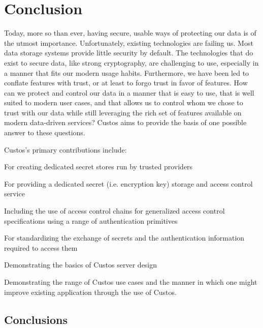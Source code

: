 \chapter{Conclusion}
\label{chap:conclusion}

Today, more so than ever, having secure, usable ways of protecting our
data is of the utmost importance. Unfortunately, existing technologies
are failing us. Most data storage systems provide little security by
default. The technologies that do exist to secure data, like strong
cryptography, are challenging to use, especially in a manner that fits
our modern usage habits. Furthermore, we have been led to conflate
features with trust, or at least to forgo trust in favor of
features. How can we protect and control our data in a manner that is
easy to use, that is well suited to modern user cases, and that allows
us to control whom we chose to trust with our data while still
leveraging the rich set of features available on modern data-driven
services?  Custos aims to provide the basis of one possible answer to
these questions.

Custos's primary contributions include:

\begin{packed_desc}
\item[Trust-Separation Architecture:] For creating dedicated secret
  stores run by trusted providers
\item[``Secret Storage as a Service Platform'':] For providing a
  dedicated secret (i.e. encryption key) storage and access control
  service
\item[A generic, flexible access control scheme:] Including the use of
  access control chains for generalized access control specifications
  using a range of authentication primitives
\item[Custos protocol:] For standardizing the exchange of secrets and
  the authentication information required to access them
\item[Custos Server Design and Implementing:] Demonstrating the basics
  of Custos server design
\item[Several Proof-of-Concept Custos Applications:] Demonstrating the
  range of Custos use cases and the manner in which one might improve
  existing application through the use of Custos.
\end{packed_desc}

\section{Conclusions}

